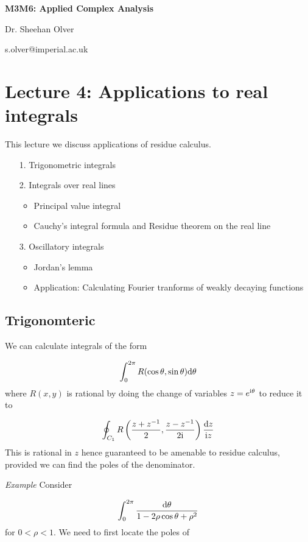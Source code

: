 \documentclass[12pt,a4paper]{article}
\def\D{ {\rm d} }
\def\I{ {\rm i} }
\begin{document}
\textbf{M3M6: Applied Complex Analysis}

Dr. Sheehan Olver

s.olver@imperial.ac.uk

\section{Lecture 4: Applications to real integrals}
This lecture we discuss applications of residue calculus. 

\begin{itemize}
\item[1. ] Trigonometric integrals


\item[2. ] Integrals over real lines

\begin{itemize}
\item Principal value integral


\item Cauchy's integral formula and Residue theorem on the real line

\end{itemize}

\item[3. ] Oscillatory integrals

\begin{itemize}
\item Jordan's lemma


\item Application: Calculating Fourier tranforms of weakly decaying functions

\end{itemize}
\end{itemize}
\subsection{Trigonomteric}
We can calculate integrals of the form 

\[
\int_0^{2 \pi} R(\cos \theta, \sin \theta) \D \theta
\]
where $R(x,y)$ is rational by doing the change of variables $z = e^{\I \theta}$ to reduce it to

\[
\oint_{C_1} R\left({z + z^{-1} \over 2}, {z - z^{-1} \over 2 \I} \right) {\D z \over \I z}
\]
This is rational in $z$ hence guaranteed to be amenable to residue calculus, provided we can find the poles of the denominator. 

\emph{Example} Consider

\[
\int_0^{2\pi} {\D \theta \over 1 - 2\rho \cos \theta + \rho^2}
\]
for $0 < \rho < 1$. We need to first locate the poles of 
\end{document}
